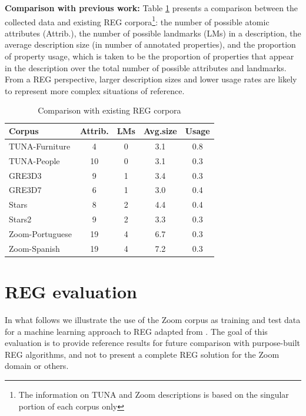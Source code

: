 \documentclass[11pt]{article}
\begin{document}
{\bf Comparison with previous work:} Table \ref{tab-comparison} presents a comparison between the collected data and existing REG corpora\footnote{The information on TUNA and Zoom descriptions is based on the singular portion of each corpus only}: the number of possible atomic attributes (Attrib.), the number of possible landmarks (LMs) in a  description, the average description size (in number of annotated properties), and the proportion of property usage, which is taken to be  the proportion of properties that appear in the description over the total number of possible attributes and landmarks. From a REG perspective, larger description sizes and lower usage rates are likely to represent more complex situations of reference.

\begin{table}[ht]
\begin{center}
\footnotesize{
\caption{Comparison with existing REG corpora}
\label{tab-comparison}
\begin{tabular} {  l c c c c}
\hline
Corpus											& Attrib.			& LMs			& Avg.size	& Usage \\
\hline
TUNA-Furniture							& 4								& 0							&	3.1				& 0.8   \\
TUNA-People									& 10							& 0							& 3.1				& 0.3   \\
GRE3D3											&	9								& 1							& 3.4				& 0.3   \\
GRE3D7											&	6								& 1							& 3.0				& 0.4   \\
Stars												&	8								& 2							& 4.4				& 0.4   \\
Stars2											& 9								& 2							& 3.3				& 0.3   \\
Zoom-Portuguese							& 19							& 4							& 6.7				& 0.3   \\
Zoom-Spanish								& 19							& 4							& 7.2				& 0.3   \\
\hline
\end{tabular}
}
\end{center}
\end{table}


\section{REG evaluation}
\label{sec-eval}

In what follows we illustrate the use of the Zoom corpus as training and test data for a machine learning approach to REG adapted from \cite{thiago-svm}. The  goal of this evaluation is to provide reference results for future comparison with purpose-built REG algorithms, and not to present a complete REG solution for the Zoom domain or others.
\end{document}
